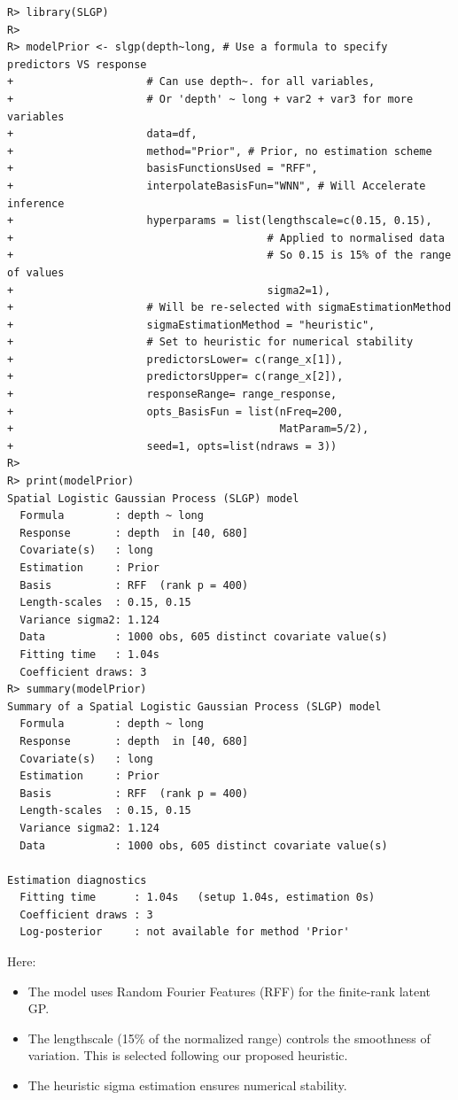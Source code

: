 \documentclass[
]{article}
\begin{document}
\begin{verbatim}
R> library(SLGP)
R> 
R> modelPrior <- slgp(depth~long, # Use a formula to specify predictors VS response
+                     # Can use depth~. for all variables,
+                     # Or 'depth' ~ long + var2 + var3 for more variables
+                     data=df,
+                     method="Prior", # Prior, no estimation scheme
+                     basisFunctionsUsed = "RFF",
+                     interpolateBasisFun="WNN", # Will Accelerate inference
+                     hyperparams = list(lengthscale=c(0.15, 0.15), 
+                                        # Applied to normalised data
+                                        # So 0.15 is 15% of the range of values
+                                        sigma2=1), 
+                     # Will be re-selected with sigmaEstimationMethod
+                     sigmaEstimationMethod = "heuristic", 
+                     # Set to heuristic for numerical stability                 
+                     predictorsLower= c(range_x[1]),
+                     predictorsUpper= c(range_x[2]),
+                     responseRange= range_response,
+                     opts_BasisFun = list(nFreq=200,
+                                          MatParam=5/2),
+                     seed=1, opts=list(ndraws = 3))
R> 
R> print(modelPrior)
Spatial Logistic Gaussian Process (SLGP) model
  Formula        : depth ~ long
  Response       : depth  in [40, 680]
  Covariate(s)   : long
  Estimation     : Prior
  Basis          : RFF  (rank p = 400)
  Length-scales  : 0.15, 0.15
  Variance sigma2: 1.124
  Data           : 1000 obs, 605 distinct covariate value(s)
  Fitting time   : 1.04s
  Coefficient draws: 3
R> summary(modelPrior)
Summary of a Spatial Logistic Gaussian Process (SLGP) model
  Formula        : depth ~ long
  Response       : depth  in [40, 680]
  Covariate(s)   : long
  Estimation     : Prior
  Basis          : RFF  (rank p = 400)
  Length-scales  : 0.15, 0.15
  Variance sigma2: 1.124
  Data           : 1000 obs, 605 distinct covariate value(s)

Estimation diagnostics
  Fitting time      : 1.04s   (setup 1.04s, estimation 0s)
  Coefficient draws : 3
  Log-posterior     : not available for method 'Prior'
\end{verbatim}

Here:

\begin{itemize}
\item
  The model uses Random Fourier Features (RFF) for the finite-rank latent GP.
\item
  The lengthscale (15\% of the normalized range) controls the smoothness of variation. This is selected following our proposed heuristic.
\item
  The heuristic sigma estimation ensures numerical stability.
\end{itemize}
\end{document}
